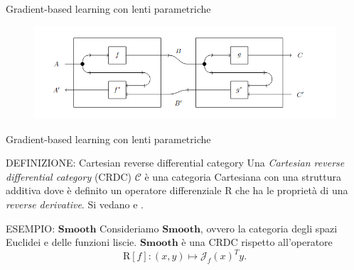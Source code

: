 \documentclass{beamer}
\begin{document}
\begin{frame}{Gradient-based learning con lenti parametriche}
    \begin{figure}
        \begin{center}
            \includegraphics[width=\textwidth]{figures/lens_composition.png}
            \caption*{\cite{cruttwell2022categorical}}
        \end{center}
    \end{figure}
\end{frame}

\begin{frame}{Gradient-based learning con lenti parametriche}
    \begin{block}{DEFINIZIONE: Cartesian reverse differential category}
        Una \textit{Cartesian reverse differential category} (CRDC) $\mathcal{C}$ è una categoria Cartesiana con una struttura additiva dove è definito un operatore differenziale $\mathrm{R}$ che ha le proprietà di una \textit{reverse derivative}.
        Si vedano \cite{cockett2019reverse} e \cite{gavranovic2024fundamental}.
      \end{block}

      \begin{block}{ESEMPIO: $\mathbf{Smooth}$}
        Consideriamo $\mathbf{Smooth}$, ovvero la categoria degli spazi Euclidei e delle funzioni liscie. $\mathbf{Smooth}$ è una CRDC rispetto all'operatore
        \[\mathrm{R}[f]: (x,y) \mapsto \mathcal{J}_f(x)^Ty.\]
      \end{block}
\end{frame}
\end{document}
